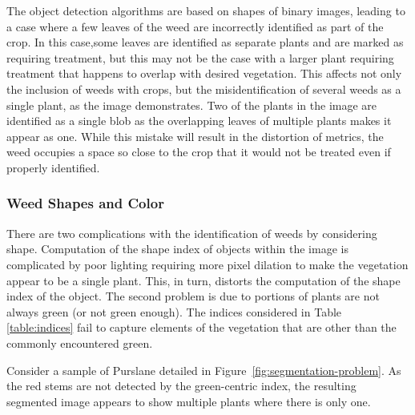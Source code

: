 \documentclass[letterpaper, notitlepage]{report}
\begin{document}
The object detection algorithms are based on shapes of binary images, leading to a case where a few leaves of the weed are incorrectly identified as part of the crop. In this case,some leaves are identified as separate plants and are marked as requiring treatment, but this may not be the case with a larger plant requiring treatment that happens to overlap with desired vegetation. This affects not only the inclusion of weeds with crops, but the misidentification of several weeds as a single plant, as the image demonstrates.  Two of the plants in the image are identified as a single blob as the overlapping leaves of multiple plants makes it appear as one. While this mistake will result in the distortion of metrics, the weed occupies a space so close to the crop that it would not be treated even if properly identified.

\subsubsection{Weed Shapes and Color}
There are two complications with the identification of weeds by considering shape.  Computation of the shape index of objects within the image is complicated by poor lighting requiring more pixel dilation to make the vegetation appear to be a single plant. This, in turn, distorts the computation of the shape index of the object. The second problem is due to portions of plants are not always green (or not green enough). The indices considered in Table \ref{table:indices} fail to capture elements of the vegetation that are other than the commonly encountered green.

Consider a sample of Purslane detailed in Figure~\ref{fig:segmentation-problem}. As the red stems are not detected by the green-centric index, the resulting segmented image appears to show multiple plants where there is only one.
\end{document}
